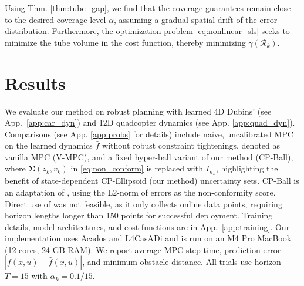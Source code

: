 \documentclass{l4dc2026}
\newcommand{\covariance}{\mathbf{\Sigma}}
\begin{document}
Using Thm. \ref{thm:tube_gap}, we find that the coverage guarantees remain close to the desired coverage level $\alpha$, assuming a gradual spatial-drift of the error distribution. Furthermore, the optimization problem \eqref{eq:nonlinear_sls} seeks to minimize the tube volume in the cost function, thereby minimizing $\gamma({\mathcal{R}}_k)$. 

\vspace{-12pt}
\section{Results}\label{sec:results}
\vspace{-3pt}

We evaluate our method on robust planning with learned 4D Dubins' (see App.~\ref{app:car_dyn}) and 12D quadcopter dynamics (see App. \ref{app:quad_dyn}). Comparisons (see App. \ref{app:probs} for details) include na\"ive, uncalibrated MPC on the learned dynamics $\hat f$ without robust constraint tightenings, denoted as vanilla MPC (V-MPC), and a fixed hyper-ball variant of our method (CP-Ball), where $\covariance(z_k,v_k)$ in \eqref{eq:non_conform} is replaced with $I_{n_x}$, highlighting the benefit of state-dependent CP-Ellipsoid (our method) uncertainty sets. CP-Ball is an adaptation of \citet{DBLP:conf/l4dc/CheeSHP24}, using the L2-norm of errors as the non-conformity score. 
Direct use of \citet{DBLP:conf/l4dc/CheeSHP24} was not feasible, as it only collects online data points, requiring horizon lengths longer than 150 points for successful deployment. 
Training details, model architectures, and cost functions are in App.~\ref{app:training}. Our implementation uses Acados \citep{verschueren2020acadosmodularopensourceframework} and L4CasADi \citep{salzmann2024l4casadi} and is run on an M4 Pro MacBook (12 cores, 24 GB RAM). We report average MPC step time, prediction error $|f(x,u) - \hat f(x,u)|$, and minimum obstacle distance. All trials use horizon $T=15$ with $\alpha_k = 0.1/15$.
\end{document}

